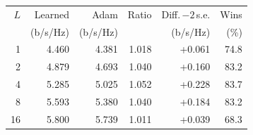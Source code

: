 \begin{tabular}{rrrrrr}
\toprule
$L$ & Learned & Adam & Ratio & Diff.\,$-2$\,s.e. & Wins \\
 & (b/s/Hz) & (b/s/Hz) & & (b/s/Hz) & (\%) \\
\midrule
1 & 4.460 & 4.381 & 1.018 & +0.061 & 74.8 \\
2 & 4.879 & 4.693 & 1.040 & +0.160 & 83.2 \\
4 & 5.285 & 5.025 & 1.052 & +0.228 & 83.7 \\
8 & 5.593 & 5.380 & 1.040 & +0.184 & 83.2 \\
16 & 5.800 & 5.739 & 1.011 & +0.039 & 68.3 \\
\bottomrule
\end{tabular}
